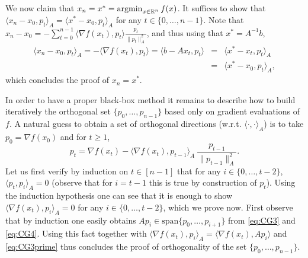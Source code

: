 We now claim that $x_n = x^* = \mathop{\mathrm{argmin}}_{x \in \mathbb{R}^n} f(x)$. It suffices to show that $\langle x_n -x_0 , p_t \rangle_A = \langle x^*-x_0 , p_t \rangle_A$ for any $t\in \{0,\hdots,n-1\}$. Note that $x_n - x_0 = - \sum_{t=0}^{n-1} \langle \nabla f(x_t), p_t \rangle \frac{p_t}{\|p_t\|_A^2}$, and thus using that $x^* = A^{-1} b$,
\begin{eqnarray*}
\langle x_n -x_0 , p_t \rangle_A = - \langle \nabla f(x_t) , p_t \rangle = \langle b - A x_t , p_t \rangle & = & \langle x^* - x_t, p_t \rangle_A \\
& = &  \langle x^* - x_0, p_t \rangle_A ,
\end{eqnarray*}
which concludes the proof of $x_n = x^*$.
\newline

In order to have a proper black-box method it remains to describe how to build iteratively the orthogonal set $\{p_0, \hdots, p_{n-1}\}$ based only on gradient evaluations of $f$. A natural guess to obtain a set of orthogonal directions (w.r.t. $\langle \cdot , \cdot \rangle_A$) is to take $p_0 = \nabla f(x_0)$ and for $t \geq 1$,
\begin{equation} \label{eq:CG4}
p_t = \nabla f(x_t) - \langle \nabla f(x_t), p_{t-1} \rangle_A \ \frac{p_{t-1}}{\|p_{t-1}\|^2_A} .
\end{equation}
Let us first verify by induction on $t \in [n-1]$ that for any $i \in \{0,\hdots,t-2\}$, $\langle p_t, p_{i}\rangle_A = 0$ (observe that for $i=t-1$ this is true by construction of $p_t$). Using the induction hypothesis one can see that it is enough to show $\langle \nabla f(x_t), p_i \rangle_A = 0$ for any $i \in \{0, \hdots, t-2\}$, which we prove now. First observe that by induction one easily obtains $A p_i \in \mathrm{span}\{p_0, \hdots, p_{i+1}\}$ from \eqref{eq:CG3} and \eqref{eq:CG4}. Using this fact together with $\langle \nabla f(x_t), p_i \rangle_A = \langle \nabla f(x_t), A p_i \rangle$ and \eqref{eq:CG3prime} thus concludes the proof of orthogonality of the set $\{p_0, \hdots, p_{n-1}\}$.

